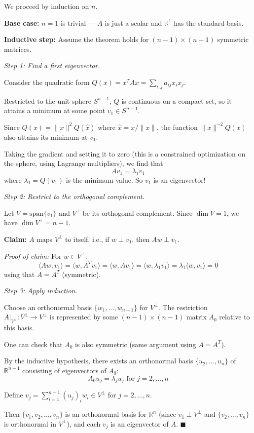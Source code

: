\documentclass[11pt, letterpaper, openany]{book}
\renewenvironment{proof}[1][\proofname]{%
  \tcolorbox[blanker, breakable, left=1em,
    before skip=1em, after skip=1em,
    borderline west={2pt}{0pt}{MagicTeal!50},
    colback=MagicCream,
    before upper={\textcolor{MagicTeal}{\sffamily\bfseries #1.}\space}
  ]%
}{%
  \hfill\textcolor{MagicTeal}{\ensuremath{\blacksquare}}\endtcolorbox%
}
\begin{document}
\begin{proof}
We proceed by induction on $n$.

\textbf{Base case:} $n = 1$ is trivial --- $A$ is just a scalar and $\mathbb{R}^1$ has the standard basis.

\textbf{Inductive step:} Assume the theorem holds for $(n-1) \times (n-1)$ symmetric matrices.

\textit{Step 1: Find a first eigenvector.}

Consider the quadratic form $Q(x) = x^T A x = \sum_{i,j} a_{ij} x_i x_j$.

Restricted to the unit sphere $S^{n-1}$, $Q$ is continuous on a compact set, so it attains a minimum at some point $v_1 \in S^{n-1}$.

Since $Q(x) = \|x\|^2 Q(\hat{x})$ where $\hat{x} = x/\|x\|$, the function $\|x\|^{-2} Q(x)$ also attains its minimum at $v_1$.

Taking the gradient and setting it to zero (this is a constrained optimization on the sphere, using Lagrange multipliers), we find that
\[Av_1 = \lambda_1 v_1\]
where $\lambda_1 = Q(v_1)$ is the minimum value. So $v_1$ is an eigenvector!

\textit{Step 2: Restrict to the orthogonal complement.}

Let $V = \text{span}\{v_1\}$ and $V^\perp$ be its orthogonal complement. Since $\dim V = 1$, we have $\dim V^\perp = n - 1$.

\textbf{Claim:} $A$ maps $V^\perp$ to itself, i.e., if $w \perp v_1$, then $Aw \perp v_1$.

\textit{Proof of claim:} For $w \in V^\perp$:
\[\langle Aw, v_1 \rangle = \langle w, A^T v_1 \rangle = \langle w, Av_1 \rangle = \langle w, \lambda_1 v_1 \rangle = \lambda_1 \langle w, v_1 \rangle = 0\]
using that $A = A^T$ (symmetric).

\textit{Step 3: Apply induction.}

Choose an orthonormal basis $\{w_1, \ldots, w_{n-1}\}$ for $V^\perp$. The restriction $A|_{V^\perp}: V^\perp \to V^\perp$ is represented by some $(n-1) \times (n-1)$ matrix $A_0$ relative to this basis.

One can check that $A_0$ is also symmetric (same argument using $A = A^T$).

By the inductive hypothesis, there exists an orthonormal basis $\{u_2, \ldots, u_n\}$ of $\mathbb{R}^{n-1}$ consisting of eigenvectors of $A_0$:
\[A_0 u_j = \lambda_j u_j \text{ for } j = 2, \ldots, n\]

Define $v_j = \sum_{i=1}^{n-1} (u_j)_i w_i \in V^\perp$ for $j = 2, \ldots, n$.

Then $\{v_1, v_2, \ldots, v_n\}$ is an orthonormal basis for $\mathbb{R}^n$ (since $v_1 \perp V^\perp$ and $\{v_2, \ldots, v_n\}$ is orthonormal in $V^\perp$), and each $v_j$ is an eigenvector of $A$.
\end{proof}
\end{document}
